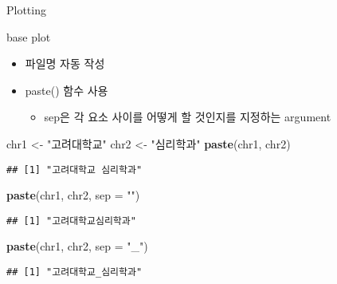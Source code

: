 \documentclass[ignorenonframetext,]{beamer}
\newenvironment{Shaded}{\begin{snugshade}}{\end{snugshade}}
\newcommand{\KeywordTok}[1]{\textcolor[rgb]{0.13,0.29,0.53}{\textbf{#1}}}
\newcommand{\DataTypeTok}[1]{\textcolor[rgb]{0.13,0.29,0.53}{#1}}
\newcommand{\StringTok}[1]{\textcolor[rgb]{0.31,0.60,0.02}{#1}}
\newcommand{\NormalTok}[1]{#1}
\providecommand{\tightlist}{%
  \setlength{\itemsep}{0pt}\setlength{\parskip}{0pt}}
\begin{document}
\begin{frame}[fragile]{Plotting}

\begin{block}{base plot}

\begin{itemize}
\item
  파일명 자동 작성
\item
  paste() 함수 사용

  \begin{itemize}
  \tightlist
  \item
    sep은 각 요소 사이를 어떻게 할 것인지를 지정하는 argument
  \end{itemize}
\end{itemize}

\begin{Shaded}
\begin{Highlighting}[]
\NormalTok{chr1 <-}\StringTok{ "고려대학교"}
\NormalTok{chr2 <-}\StringTok{ "심리학과"}
\KeywordTok{paste}\NormalTok{(chr1, chr2) }
\end{Highlighting}
\end{Shaded}

\begin{verbatim}
## [1] "고려대학교 심리학과"
\end{verbatim}

\begin{Shaded}
\begin{Highlighting}[]
\KeywordTok{paste}\NormalTok{(chr1, chr2, }\DataTypeTok{sep =} \StringTok{""}\NormalTok{) }
\end{Highlighting}
\end{Shaded}

\begin{verbatim}
## [1] "고려대학교심리학과"
\end{verbatim}

\begin{Shaded}
\begin{Highlighting}[]
\KeywordTok{paste}\NormalTok{(chr1, chr2, }\DataTypeTok{sep =} \StringTok{"_"}\NormalTok{) }
\end{Highlighting}
\end{Shaded}

\begin{verbatim}
## [1] "고려대학교_심리학과"
\end{verbatim}

\end{block}

\end{frame}
\end{document}
